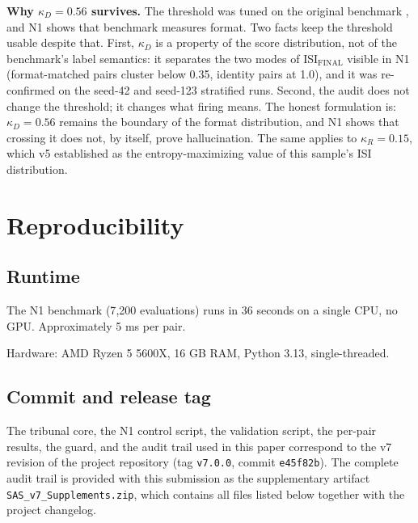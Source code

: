\documentclass[11pt,a4paper]{article}
\begin{document}
\textbf{Why $\kappa_D = 0.56$ survives.} The threshold was tuned on the original benchmark \citep{durante2026a}, and N1 shows that benchmark measures format. Two facts keep the threshold usable despite that. First, $\kappa_D$ is a property of the score distribution, not of the benchmark's label semantics: it separates the two modes of ISI$_{\text{FINAL}}$ visible in N1 (format-matched pairs cluster below 0.35, identity pairs at 1.0), and it was re-confirmed on the seed-42 and seed-123 stratified runs. Second, the audit does not change the threshold; it changes what firing means. The honest formulation is: $\kappa_D = 0.56$ remains the boundary of the format distribution, and N1 shows that crossing it does not, by itself, prove hallucination. The same applies to $\kappa_R = 0.15$, which v5 established as the entropy-maximizing value of this sample's ISI distribution.

\section{Reproducibility}
\label{sec:reproducibility}

\subsection{Runtime}
The N1 benchmark (7{,}200 evaluations) runs in 36 seconds on a single CPU, no GPU. Approximately 5 ms per pair.

Hardware: AMD Ryzen 5 5600X, 16 GB RAM, Python 3.13, single-threaded.

\subsection{Commit and release tag}

The tribunal core, the N1 control script, the validation script, the
per-pair results, the guard, and the audit trail used in this paper
correspond to the v7 revision of the project repository (tag
\texttt{v7.0.0}, commit \texttt{e45f82b}). The complete audit trail is provided with this
submission as the supplementary artifact
\texttt{SAS\_v7\_Supplements.zip}, which contains all files listed
below together with the project changelog.
\end{document}
